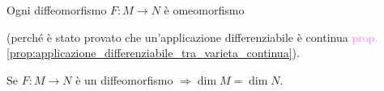         \begin{proposizione}
        \label{prop:diffeomorfismo_tra_varieta_omeomorfo}
        \mbox{}

        Ogni diffeomorfismo $F \colon M \to N$ è omeomorfismo 
        
        \textcolor{blu}{(perché è stato provato che un'applicazione differenziabile è continua \textcolor{violet}{prop. \ref{prop:applicazione_differenziabile_tra_varieta_continua}})}.
        \end{proposizione}

        \begin{proposizione}
        \mbox{}

        Se $F \colon M \to N$ è un diffeomorfismo $\Rightarrow \dim M = \dim N$.
        \end{proposizione}

